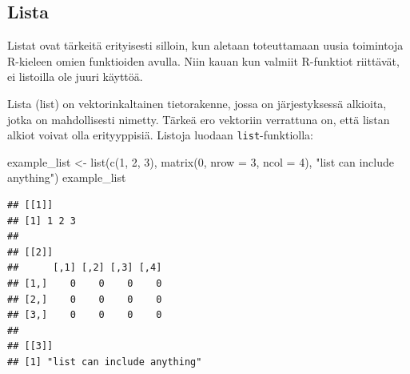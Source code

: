 \documentclass[
]{book}
\newenvironment{Shaded}{\begin{snugshade}}{\end{snugshade}}
\newcommand{\AttributeTok}[1]{\textcolor[rgb]{0.77,0.63,0.00}{#1}}
\newcommand{\DecValTok}[1]{\textcolor[rgb]{0.00,0.00,0.81}{#1}}
\newcommand{\FunctionTok}[1]{\textcolor[rgb]{0.00,0.00,0.00}{#1}}
\newcommand{\NormalTok}[1]{#1}
\newcommand{\OtherTok}[1]{\textcolor[rgb]{0.56,0.35,0.01}{#1}}
\newcommand{\StringTok}[1]{\textcolor[rgb]{0.31,0.60,0.02}{#1}}
\begin{document}
\hypertarget{list}{%
\subsection{Lista}\label{list}}

Listat ovat tärkeitä erityisesti silloin, kun aletaan toteuttamaan uusia toimintoja R-kieleen omien funktioiden avulla. Niin kauan kun valmiit R-funktiot riittävät, ei listoilla ole juuri käyttöä.

Lista (list) on vektorinkaltainen tietorakenne, jossa on järjestyksessä alkioita, jotka on mahdollisesti nimetty. Tärkeä ero vektoriin verrattuna on, että listan alkiot voivat olla erityyppisiä. Listoja luodaan \texttt{list}-funktiolla:

\begin{Shaded}
\begin{Highlighting}[]
\NormalTok{example\_list }\OtherTok{\textless{}{-}} \FunctionTok{list}\NormalTok{(}\FunctionTok{c}\NormalTok{(}\DecValTok{1}\NormalTok{, }\DecValTok{2}\NormalTok{, }\DecValTok{3}\NormalTok{),}
                     \FunctionTok{matrix}\NormalTok{(}\DecValTok{0}\NormalTok{, }\AttributeTok{nrow =} \DecValTok{3}\NormalTok{, }\AttributeTok{ncol =} \DecValTok{4}\NormalTok{),}
                     \StringTok{"list can include anything"}\NormalTok{)}
\NormalTok{example\_list}
\end{Highlighting}
\end{Shaded}

\begin{verbatim}
## [[1]]
## [1] 1 2 3
## 
## [[2]]
##      [,1] [,2] [,3] [,4]
## [1,]    0    0    0    0
## [2,]    0    0    0    0
## [3,]    0    0    0    0
## 
## [[3]]
## [1] "list can include anything"
\end{verbatim}
\end{document}
